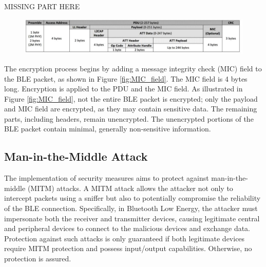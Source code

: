 \documentclass{Configuration_Files/PoliMi3i_thesis}
\begin{document}
MISSING PART HERE

\begin{figure}[H]
    \centering
    \includegraphics[scale=0.7]{Bluetooth_Security/10.png}
    \label{fig:pairing_procedure}
\end{figure}

The encryption process begins by adding a message integrity check (MIC) field to the BLE packet, as shown in Figure \ref{fig:MIC_field}. The MIC field is 4 bytes long. Encryption is applied to the PDU and the MIC field. As illustrated in Figure \ref{fig:MIC_field}, not the entire BLE packet is encrypted; only the payload and MIC field are encrypted, as they may contain sensitive data. The remaining parts, including headers, remain unencrypted. The unencrypted portions of the BLE packet contain minimal, generally non-sensitive information.

\subsection{Man-in-the-Middle Attack}

The implementation of security measures aims to protect against man-in-the-middle (MITM) attacks. A MITM attack allows the attacker not only to intercept packets using a sniffer but also to potentially compromise the reliability of the BLE connection. Specifically, in Bluetooth Low Energy, the attacker must impersonate both the receiver and transmitter devices, causing legitimate central and peripheral devices to connect to the malicious devices and exchange data. Protection against such attacks is only guaranteed if both legitimate devices require MITM protection and possess input/output capabilities. Otherwise, no protection is assured.
\end{document}
